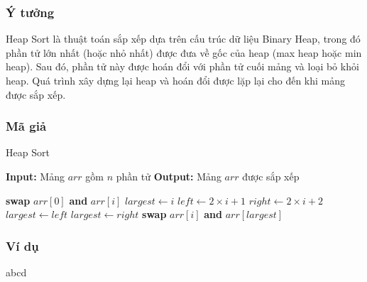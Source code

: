 \subsubsection{Ý tưởng}
Heap Sort là thuật toán sắp xếp dựa trên cấu trúc dữ liệu Binary Heap, trong đó phần tử lớn nhất (hoặc nhỏ nhất) được đưa về gốc của heap (max heap hoặc min heap). Sau đó, phần tử này được hoán đổi với phần tử cuối mảng và loại bỏ khỏi heap. Quá trình xây dựng lại heap và hoán đổi được lặp lại cho đến khi mảng được sắp xếp.

\subsubsection{Mã giả}
\begin{algorithm}[H]
\caption{Heap Sort}
\begin{algorithmic}[1]
    \State \textbf{Input:} Mảng $arr$ gồm $n$ phần tử
    \State \textbf{Output:} Mảng $arr$ được sắp xếp
    
        \State {}
    \EndFor
    
        \State \textbf{swap} $arr[0]$ \textbf{and} $arr[i]$
        \State {}
    \EndFor
\EndProcedure
{}
    \State $largest \gets i$
    \State $left \gets 2\times i + 1$
    \State $right \gets 2\times i + 2$
        \State $largest \gets left$
    \EndIf
        \State $largest \gets right$
    \EndIf
        \State \textbf{swap} $arr[i]$ \textbf{and} $arr[largest]$
        \State {}
    \EndIf
\EndProcedure
\end{algorithmic}
\end{algorithm}

\subsubsection{Ví dụ}
abcd